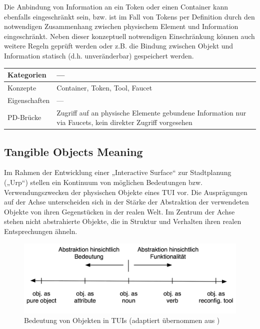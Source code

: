 Die Anbindung von Information an ein Token oder einen Container kann ebenfalls eingeschränkt sein, bzw. ist im Fall von Tokens per Definition durch den notwendigen Zusammenhang zwischen physischem Element und Information eingeschränkt. Neben dieser konzeptuell notwendigen Einschränkung können auch weitere Regeln geprüft werden oder z.B. die Bindung zwischen Objekt und Information statisch (d.h. unveränderbar) gespeichert werden. 

\begin{tabular}{| p{3cm} | p{10cm} |}
  \hline
  Kategorien & --- \\ \hline
  Konzepte & Container, Token, Tool, Faucet \\ \hline
  Eigenschaften & --- \\ \hline
  PD-Brücke & Zugriff auf an physische Elemente gebundene Information nur via Faucets, kein direkter Zugriff vorgesehen \\ \hline
\end{tabular} 

\subsection{Tangible Objects Meaning} %
\label{sub:tangible_objects_meaning}

Im Rahmen der Entwicklung einer „Interactive Surface“ zur Stadtplanung („Urp“) stellen \citet{Underkoffler99} ein Kontinuum von möglichen Bedeutungen bzw. Verwendungszwecken der physischen Objekte eines \gls{TUI} vor. Die Ausprägungen auf der Achse unterscheiden sich in der Stärke der Abstraktion der verwendeten Objekte von ihren Gegenstücken in der realen Welt. Im Zentrum der Achse stehen nicht abstrahierte Objekte, die in Struktur und Verhalten ihren realen Entsprechungen ähneln.
\begin{figure}[htbp]
	\centering
		\includegraphics[width=12cm]{img/ImplementierungUeberblick/ObjectMeaning.png}
	\caption[Bedeutung von Objekten in TUIs]{Bedeutung von Objekten in TUIs (adaptiert übernommen aus \citep{Underkoffler99})}
	\label{fig:img_ImplementierungUeberblick_ObjectMeaning}
\end{figure}

